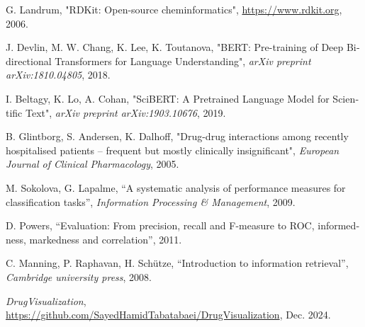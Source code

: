 \begin{thebibliography}{99}
\begin{latin}
G. Landrum, "RDKit: Open-source cheminformatics", \url{https://www.rdkit.org}, 2006.

J. Devlin, M. W. Chang, K. Lee, K. Toutanova, "BERT: Pre-training of Deep Bidirectional Transformers for Language Understanding", \textit{arXiv preprint arXiv:1810.04805}, 2018.

I. Beltagy, K. Lo, A. Cohan, "SciBERT: A Pretrained Language Model for Scientific Text", \textit{arXiv preprint arXiv:1903.10676}, 2019.

B. Glintborg, S. Andersen, K. Dalhoff, "Drug-drug interactions among recently hospitalised patients – frequent but mostly clinically insignificant", \textit{European Journal of Clinical Pharmacology}, 2005.

M. Sokolova, G. Lapalme, “A systematic analysis of performance measures for classification tasks”, \textit{Information Processing \& Management}, 2009.

D. Powers, “Evaluation: From precision, recall and F-measure to ROC, informedness, markedness and correlation”, 2011.

C. Manning, P. Raphavan, H. Schütze, “Introduction to information retrieval”, \textit{Cambridge university press}, 2008.

\textit{DrugVisualization}, \url{https://github.com/SayedHamidTabatabaei/DrugVisualization}, Dec. 2024.











\end{latin}


\end{thebibliography}
